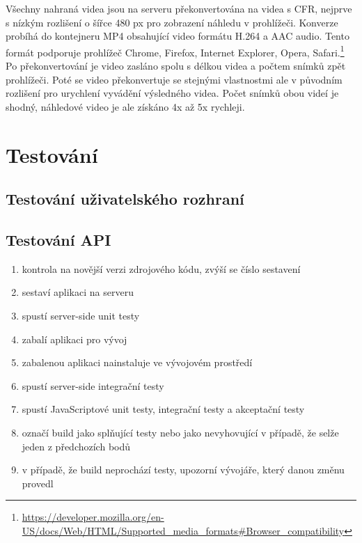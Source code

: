 Všechny nahraná videa jsou na serveru překonvertována na videa s CFR, nejprve s nízkým rozlišení o šířce 480 px pro zobrazení náhledu v prohlížeči. Konverze probíhá do kontejneru MP4 obsahující video formátu H.264 a AAC audio. Tento formát podporuje prohlížeč Chrome, Firefox, Internet Explorer, Opera, Safari.\footnote{\url{https://developer.mozilla.org/en-US/docs/Web/HTML/Supported_media_formats\#Browser_compatibility}} Po překonvertování je video zasláno spolu s délkou videa a počtem snímků zpět prohlížeči. Poté se video překonvertuje se stejnými vlastnostmi ale v původním rozlišení pro urychlení vyvádění výsledného videa. Počet snímků obou videí je shodný, náhledové video je ale získáno 4x až 5x rychleji.

\chapter{Testování}
\section{Testování uživatelského rozhraní}
\section{Testování API}


\begin{enumerate}
\item kontrola na novější verzi zdrojového kódu, zvýší se číslo sestavení
\item sestaví aplikaci na serveru
\item spustí server-side unit testy
\item zabalí aplikaci pro vývoj
\item zabalenou aplikaci nainstaluje ve vývojovém prostředí
\item spustí server-side integrační testy
\item spustí JavaScriptové unit testy, integrační testy a akceptační testy
\item označí build jako splňující testy nebo jako nevyhovující v případě, že selže jeden z předchozích bodů
\item v případě, že build neprochází testy, upozorní vývojáře, který danou změnu provedl
\end{enumerate}

